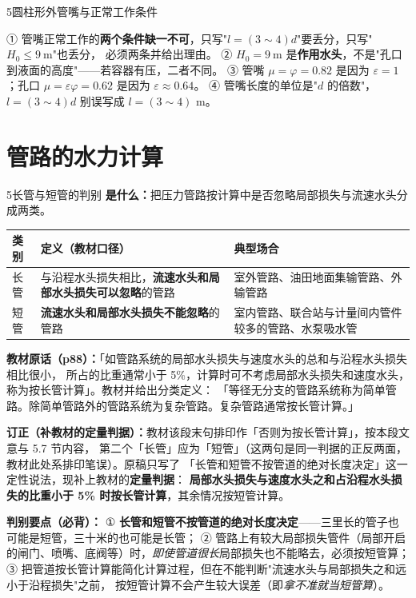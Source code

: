 \begin{kaodian}{5}{圆柱形外管嘴与正常工作条件}
\begin{yicuo}
① 管嘴正常工作的\textbf{两个条件缺一不可}，只写"$l=(3\sim4)d$"要丢分，只写"$H_0\le9\ \mathrm{m}$"也丢分，
必须两条并给出理由。
② $H_0=9\ \mathrm{m}$ 是\textbf{作用水头}，不是"孔口到液面的高度"——若容器有压，二者不同。
③ 管嘴 $\mu=\varphi=0.82$ 是因为 $\varepsilon=1$；孔口 $\mu=\varepsilon\varphi=0.62$ 是因为 $\varepsilon\approx0.64$。
④ 管嘴长度的单位是"$d$ 的倍数"，$l=(3\sim4)d$ 别误写成 $l=(3\sim4)$ m。
\end{yicuo}
\end{kaodian}

\section{管路的水力计算}

\begin{kaodian}{5}{长管与短管的判别}
\textbf{是什么：}把压力管路按计算中是否忽略局部损失与流速水头分成两类。
\begin{center}
\begin{tabularx}{\textwidth}{@{}lXX@{}}
\toprule
类别 & 定义（教材口径） & 典型场合 \\
\midrule
长管 & 与沿程水头损失相比，\textbf{流速水头和局部水头损失可以忽略}的管路 & 室外管路、油田地面集输管路、外输管路 \\
短管 & \textbf{流速水头和局部水头损失不能忽略}的管路 & 室内管路、联合站与计量间内管件较多的管路、水泵吸水管 \\
\bottomrule
\end{tabularx}
\end{center}

\noindent\textbf{教材原话（p88）：}「如管路系统的局部水头损失与速度水头的总和与沿程水头损失相比很小，
所占的比重通常小于 5\%，计算时可不考虑局部水头损失和速度水头，称为按长管计算」。教材并给出分类定义：
「等径无分支的管路系统称为简单管路。除简单管路外的管路系统为复杂管路。复杂管路通常按长管计算。」

\begin{tishi}
\textbf{订正（补教材的定量判据）：}教材该段末句排印作「否则为按长管计算」，按本段文意与 5.7 节内容，
第二个「长管」应为「短管」（这两句是同一判据的正反两面，教材此处系排印笔误）。原稿只写了
「长管和短管不按管道的绝对长度决定」这一定性说法，现补上教材的\textbf{定量判据}：
\textbf{局部水头损失与速度水头之和占沿程水头损失的比重小于 5\% 时按长管计算}，其余情况按短管计算。
\end{tishi}

\textbf{判别要点（必背）：}
① \textbf{长管和短管不按管道的绝对长度决定}——三里长的管子也可能是短管，三十米的也可能是长管；
② 管路上有较大局部损失管件（局部开启的闸门、喷嘴、底阀等）时，\emph{即使管道很长}局部损失也不能略去，必须按短管算；
③ 把管道按长管计算能简化计算过程，但在不能判断"流速水头与局部损失之和远小于沿程损失"之前，
按短管计算不会产生较大误差（即\emph{拿不准就当短管算}）。


\end{kaodian}
